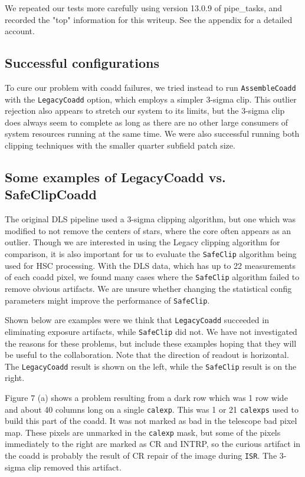 \documentclass[DM,toc]{lsstdoc}
\begin{document}
We repeated our tests more carefully using version 13.0.9 of pipe\_tasks, and recorded the "top" information for this writeup. See the appendix for a detailed account.

\subsection{Successful configurations}
To cure our problem with coadd failures, we tried instead to run {\tt\string AssembleCoadd} with the {\tt\string LegacyCoadd} option, which employs a simpler 3-sigma clip. This outlier rejection also appears to stretch our system to its limits, but the 3-sigma clip does always seem to complete as long as there are no other large consumers of system resources running at the same time.
We were also successful running both clipping techniques with the smaller quarter subfield patch size.
\subsection{Some examples of LegacyCoadd vs. SafeClipCoadd}
The original DLS pipeline used a 3-sigma clipping algorithm, but one which was modified to not remove the centers of stars, where the core often appears as an outlier. Though we are interested in using the Legacy clipping algorithm for comparison, it is also important for us to evaluate the {\tt\string SafeClip} algorithm being used for HSC processing.
With the DLS data, which has up to 22 measurements of each coadd pixel, we found many cases where the {\tt\string SafeClip} algorithm failed to remove obvious artifacts. We are unsure whether changing the statistical config parameters might improve the performance of {\tt\string SafeClip}.

Shown below are examples were we think that {\tt\string LegacyCoadd} succeeded in eliminating exposure artifacts, while {\tt\string SafeClip} did not. We have not investigated the reasons for these problems, but include these examples hoping that they will be useful to the collaboration.  Note that the direction of readout is horizontal.  The {\tt\string LegacyCoadd} result is shown on the left, while the {\tt\string SafeClip} result is on the right.

Figure 7 (a) shows a problem resulting from a dark row which was 1 row wide and about 40 columns long on a single {\tt\string calexp}.  This was 1 or 21 {\tt\string calexps} used to build this part of the coadd. It was not marked as bad in the telescope bad pixel map. These pixels are unmarked in the {\tt\string calexp} mask, but some of the pixels immediately to the right are marked as CR and INTRP, so the curious artifact in the coadd is probably the result of CR repair of the image during {\tt\string ISR}.  The 3-sigma clip removed this artifact.
\end{document}
